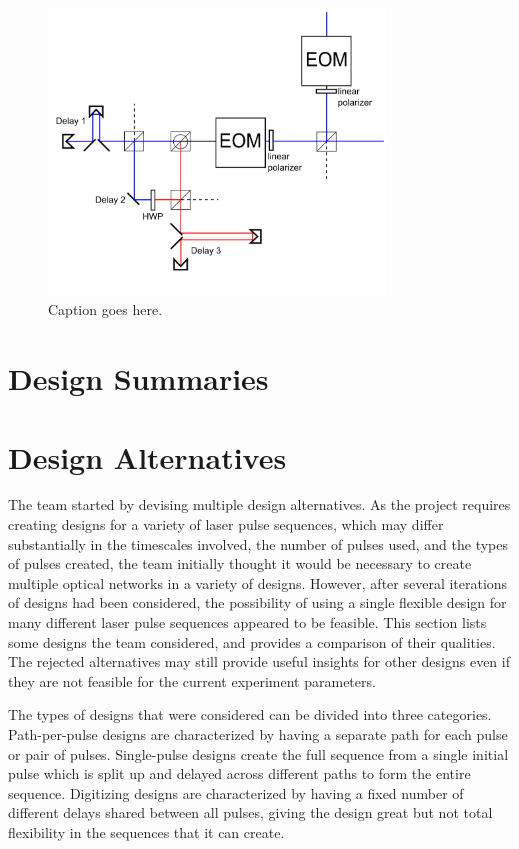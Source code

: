 \documentclass[pdftex,12pt,a4paper]{article}
\begin{document}
 \begin{figure}[t]
\centering
\includegraphics[width=0.8\textwidth]{digdesign1.png}
\caption{Caption goes here.}
\label{fig:digdesign1}
\end{figure}



\section{Design Summaries}
\label{sec:design_summary}

\section{Design Alternatives}
\label{sec:design_alternatives}
The team started by devising multiple design alternatives. As the project requires creating designs for a variety of laser pulse sequences, which may differ substantially in the timescales involved, the number of pulses used, and the types of pulses created, the team initially thought it would be necessary to create multiple optical networks in a variety of designs. However, after several iterations of designs had been considered, the possibility of using a single flexible design for many different laser pulse sequences appeared to be feasible. This section lists some designs the team considered, and provides a comparison of their qualities. The rejected alternatives may still provide useful insights for other designs even if they are not feasible for the current experiment parameters.

	The types of designs that were considered can be divided into three categories.  Path-per-pulse designs are characterized by having a separate path for each pulse or pair of pulses. Single-pulse designs create the full sequence from a single initial pulse which is split up and delayed across different paths to form the entire sequence. Digitizing designs are characterized by having a fixed number of different delays shared between all pulses, giving the design great but not total flexibility in the sequences that it can create.
    
\end{document}

